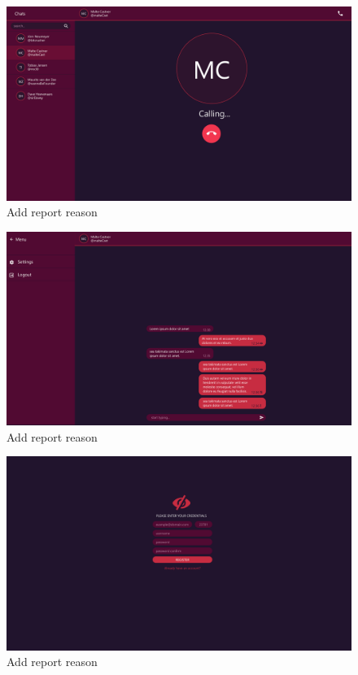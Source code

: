 \begin{figure}[h]
    \centering
    \includegraphics[width=1.0\textwidth]{./graphics/wireframes/MakeACall}
    \caption{Add report reason}
    \label{fig:figure24}
\end{figure}

\begin{figure}[h]
    \centering
    \includegraphics[width=1.0\textwidth]{./graphics/wireframes/MenuDialog}
    \caption{Add report reason}
    \label{fig:figure25}
\end{figure}

\begin{figure}[h]
    \centering
    \includegraphics[width=1.0\textwidth]{./graphics/wireframes/Register}
    \caption{Add report reason}
    \label{fig:figure26}
\end{figure}

